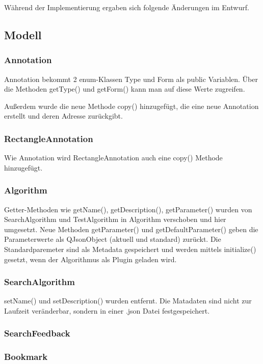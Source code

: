 Während der Implementierung ergaben sich folgende Änderungen im Entwurf.

\subsection{Modell}
\subsubsection{Annotation}
Annotation bekommt 2 enum-Klassen Type und Form als public Variablen. Über die Methoden getType() und getForm() kann man auf diese Werte zugreifen.

Außerdem wurde die neue Methode copy() hinzugefügt, die eine neue Annotation erstellt und deren Adresse zurückgibt. 

\subsubsection{RectangleAnnotation}
Wie Annotation wird RectangleAnnotation auch eine copy() Methode hinzugefügt.

\subsubsection{Algorithm}
Getter-Methoden wie getName(), getDescription(), getParameter() wurden von SearchAlgorithm und TestAlgorithm in Algorithm verschoben und hier umgesetzt. 
Neue Methoden getParameter() und getDefaultParameter() geben die Parameterwerte als QJsonObject (aktuell und standard) zurückt. Die Standardparemeter sind als Metadata gespeichert und werden mittels initialize() gesetzt, wenn der Algorithmus als Plugin geladen wird.

\subsubsection{SearchAlgorithm}
setName() und setDescription() wurden entfernt. Die Matadaten sind nicht zur Laufzeit veränderbar, sondern in einer .json Datei festgespeichert.

\subsubsection{SearchFeedback}

\subsubsection{Bookmark}

